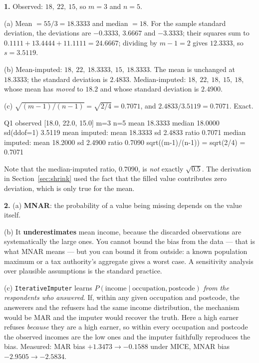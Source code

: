 \documentclass[11pt]{article}
\begin{document}
\textbf{1.} Observed: $18,\ 22,\ 15$, so $m = 3$ and $n = 5$.

(a) Mean $= 55/3 = 18.3333$ and median $= 18$. For the sample standard
deviation, the deviations are $-0.3333$, $3.6667$ and $-3.3333$; their squares
sum to $0.1111 + 13.4444 + 11.1111 = 24.6667$; dividing by $m - 1 = 2$ gives
$12.3333$, so $s = 3.5119$.

(b) Mean-imputed: $18,\ 22,\ 18.3333,\ 15,\ 18.3333$. The mean is unchanged at
$18.3333$; the standard deviation is $2.4833$. Median-imputed:
$18,\ 22,\ 18,\ 15,\ 18$, whose mean has \emph{moved} to $18.2$ and whose
standard deviation is $2.4900$.

(c) $\sqrt{(m-1)/(n-1)} = \sqrt{2/4} = 0.7071$, and
$2.4833/3.5119 = 0.7071$. Exact.

\begin{codeout}
Q1  observed [18.0, 22.0, 15.0]  m=3  n=5
    mean 18.3333   median 18.0000   sd(ddof=1) 3.5119
    mean   imputed: mean 18.3333  sd 2.4833  ratio 0.7071
    median imputed: mean 18.2000  sd 2.4900  ratio 0.7090
    sqrt((m-1)/(n-1)) = sqrt(2/4) = 0.7071
\end{codeout}

Note that the median-imputed ratio, $0.7090$, is \emph{not} exactly
$\sqrt{0.5}$. The derivation in Section~\ref{sec:shrink} used the fact that the
filled value contributes zero deviation, which is only true for the mean.

\medskip
\textbf{2.} (a) \textbf{MNAR}: the probability of a value being missing depends
on the value itself.

(b) It \textbf{underestimates} mean income, because the discarded
observations are systematically the large ones. You cannot bound the bias from
the data --- that is what MNAR means --- but you can bound it from outside: a
known population maximum or a tax authority's aggregate gives a worst case. A
sensitivity analysis over plausible assumptions is the standard practice.

(c) \texttt{IterativeImputer} learns $P(\text{income} \mid \text{occupation},
\text{postcode})$ \emph{from the respondents who answered}. If, within any
given occupation and postcode, the answerers and the refusers had the same
income distribution, the mechanism would be MAR and the imputer would recover
the truth. Here a high earner refuses \emph{because} they are a high earner, so
within every occupation and postcode the observed incomes are the low ones and
the imputer faithfully reproduces the bias. Measured: MAR bias
$+1.3473 \to -0.1588$ under MICE, MNAR bias $-2.9505 \to -2.5834$.
\end{document}
